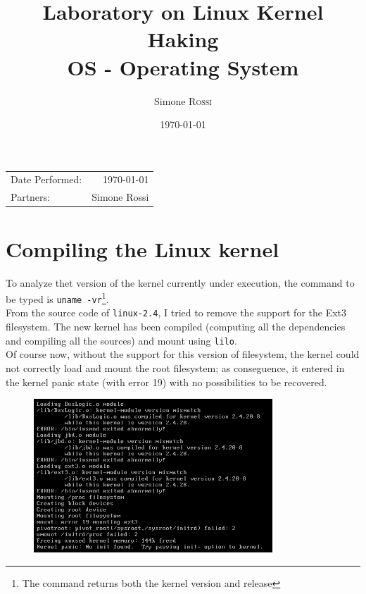 \documentclass{article}
\title{Laboratory on Linux Kernel Haking \\ OS - Operating System} %
\author{Simone \textsc{Rossi}} %
\date{\today} %
\begin{document}
\maketitle %

\begin{center}
\begin{tabular}{l r}
Date Performed: & \today \\ %
Partners: & Simone Rossi \\ %
\end{tabular}
\end{center}



\section{Compiling the Linux kernel}
To analyze thet version of the kernel currently under execution, the command to be typed is 
\texttt{uname -vr}\footnote{The command returns both the kernel version and release}.\\

From the source code of \texttt{linux-2.4}, I tried to remove the support for the Ext3 
filesystem. The new kernel has been compiled (computing all the dependencies and compiling
all the sources) and mount using \texttt{lilo}.\\

Of course now, without the support for this version of filesystem, the kernel could not correctly 
load and mount the root filesystem; as conseguence, it entered in the kernel panic state (with error
19) with no possibilities to be recovered.\\

\begin{figure}
\centering
  \includegraphics[width=0.8\textwidth]{./kernel_panic.png}
\end{figure}
\end{document}

